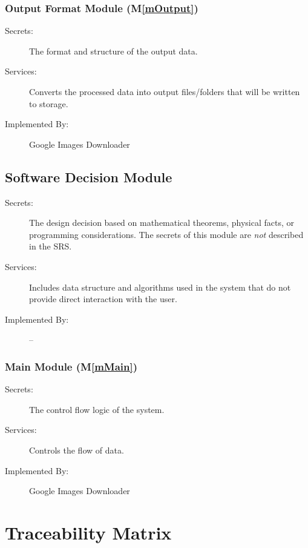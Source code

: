 \documentclass[12pt, titlepage]{article}
\newcommand{\mref}[1]{M\ref{#1}}
\begin{document}
\subsubsection{Output Format Module (\mref{mOutput})}

\begin{description}
\item[Secrets:]The format and structure of the output data.
\item[Services:]Converts the processed data into output 
files/folders that will be written to storage.
\item[Implemented By:]Google Images Downloader
\end{description}

\subsection{Software Decision Module}

\begin{description}
\item[Secrets:] The design decision based on mathematical theorems, physical
  facts, or programming considerations. The secrets of this module are
  \emph{not} described in the SRS.
\item[Services:] Includes data structure and algorithms used in the system that
  do not provide direct interaction with the user. 
\item[Implemented By:] --
\end{description}

\subsubsection{Main Module (\mref{mMain})}

\begin{description}
\item[Secrets:]The control flow logic of the system.
\item[Services:]Controls the flow of data.
\item[Implemented By:]Google Images Downloader
\end{description}

\newpage

\section{Traceability Matrix} \label{SecTM}
\end{document}
